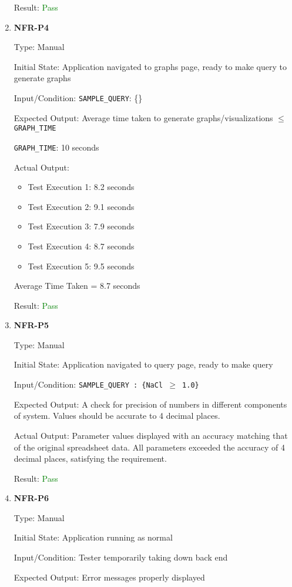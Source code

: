 \documentclass[12pt, titlepage]{article}
\begin{document}
\begin{enumerate}
Result: \textcolor{green}{Pass} 

\item{\textbf{NFR-P4}} \label{NFR:P4}

Type: Manual

Initial State: Application navigated to graphs page, ready to make query to
generate graphs

Input/Condition: \texttt{SAMPLE\_QUERY}: \{\}
  
Expected Output: Average time taken to generate graphs/visualizations $\leq$
\texttt{GRAPH\_TIME}

\texttt{GRAPH\_TIME}: 10 seconds

Actual Output:
\begin{itemize}
  \item Test Execution 1: 8.2 seconds
  \item Test Execution 2: 9.1 seconds
  \item Test Execution 3: 7.9 seconds
  \item Test Execution 4: 8.7 seconds
  \item Test Execution 5: 9.5 seconds
\end{itemize}
Average Time Taken = 8.7 seconds

Result: \textcolor{green}{Pass}

\item{\textbf{NFR-P5}} \label{NFR:P5}

Type: Manual

Initial State: Application navigated to query page, ready to make query

Input/Condition: \texttt{SAMPLE\_QUERY : \{NaCl $\ge$ 1.0\}}

Expected Output: A check for precision of numbers in different components of
system. Values should be accurate to 4 decimal places.

Actual Output: Parameter values displayed with an accuracy matching that of the
original spreadsheet data. All parameters exceeded the accuracy of 4 decimal
places, satisfying the requirement.

Result: \textcolor{green}{Pass}

\item{\textbf{NFR-P6}} \label{NFR:P6}

Type: Manual

Initial State: Application running as normal

Input/Condition: Tester temporarily taking down back end

Expected Output: Error messages properly displayed


\end{enumerate}
\end{document}
